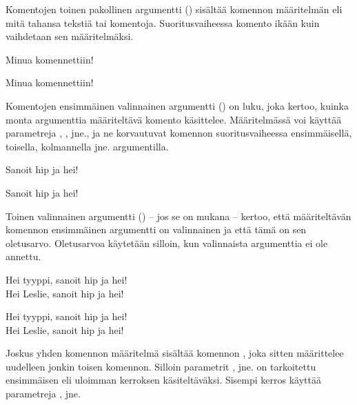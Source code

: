 Komentojen toinen pakollinen argumentti () sisältää
komennon määritelmän eli mitä tahansa tekstiä tai komentoja.
Suoritusvaiheessa komento ikään kuin vaihdetaan sen määritelmäksi.

\pagebreak[3]

\begin{koodilohkosis}
  \newcommand{\komento}{Minua komennettiin!}
  \komento
\end{koodilohkosis}

\begin{tulossis}
  Minua komennettiin!
\end{tulossis}

Komentojen ensimmäinen valinnainen argumentti () on luku, joka
kertoo, kuinka monta argumenttia määriteltävä komento käsittelee.
Määritelmässä voi käyttää parametreja , ,
 jne., ja ne korvautuvat komennon suoritusvaiheessa
ensimmäisellä, toisella, kolmannella jne. argumentilla.

\pagebreak[3]

\begin{koodilohkosis}
  \newcommand{\komento}[2]{Sanoit #1 ja #2!}
  \komento{hip}{hei}
\end{koodilohkosis}

\begin{tulossis}
  Sanoit hip ja hei!
\end{tulossis}

Toinen valinnainen argumentti () -- jos se on mukana --
kertoo, että määriteltävän komennon ensimmäinen argumentti on
valinnainen ja että tämä on sen ole\-tus\-arvo. Ole\-tus\-arvoa
käytetään silloin, kun valinnaista argumenttia ei ole annettu.

\pagebreak[3]

\begin{koodilohkosis}
  \newcommand{\komento}[3][tyyppi]{Hei #1, sanoit #2 ja #3!}
  \komento{hip}{hei} \\
  \komento[Leslie]{hip}{hei}
\end{koodilohkosis}

\begin{tulossis}
  Hei tyyppi, sanoit hip ja hei! \\
  Hei Leslie, sanoit hip ja hei!
\end{tulossis}

Joskus yhden komennon määritelmä sisältää komennon , joka sitten määrittelee uudelleen jonkin toisen
komennon. Silloin parametrit ,  jne. on
tarkoitettu ensimmäisen eli uloimman kerroksen käsiteltäväksi. Sisempi
kerros käyttää parametreja ,  jne.

